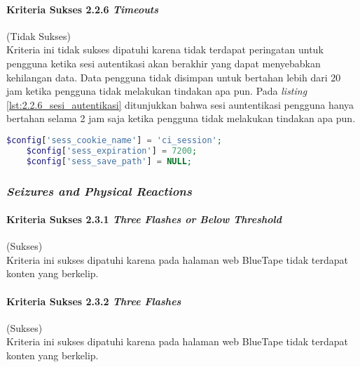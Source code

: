 \paragraph{Kriteria Sukses 2.2.6 \textit{Timeouts}}
\label{par:kepatuhan_bluetape_kriteria_sukses_2.2.6}
(Tidak Sukses)\\

Kriteria ini tidak sukses dipatuhi karena tidak terdapat peringatan untuk pengguna ketika sesi autentikasi akan berakhir yang dapat menyebabkan kehilangan data. Data pengguna tidak disimpan untuk bertahan lebih dari 20 jam ketika pengguna tidak melakukan tindakan apa pun. Pada \textit{listing} \ref{lst:2.2.6_sesi_autentikasi} ditunjukkan bahwa sesi auntentikasi pengguna hanya bertahan selama 2 jam saja ketika pengguna tidak melakukan tindakan apa pun.

\begin{lstlisting}[frame=single, label={lst:2.2.6_sesi_autentikasi}, language=PHP, caption=Kriteria Sukses 2.2.6 - Sesi Autentikasi]
    $config['sess_cookie_name'] = 'ci_session';
    $config['sess_expiration'] = 7200;
    $config['sess_save_path'] = NULL;
\end{lstlisting}

\subsubsection{\textit{Seizures and Physical Reactions}}
\label{subsubsec:kepatuhan_bluetape_seizures_and_physical_reactions}

\paragraph{Kriteria Sukses 2.3.1 \textit{Three Flashes or Below Threshold}}
\label{par:kepatuhan_bluetape_kriteria_sukses_2.3.1}
(Sukses)\\

Kriteria ini sukses dipatuhi karena pada halaman web BlueTape tidak terdapat konten yang berkelip.

\paragraph{Kriteria Sukses 2.3.2 \textit{Three Flashes}}
\label{par:kepatuhan_bluetape_kriteria_sukses_2.3.2}
(Sukses)\\

Kriteria ini sukses dipatuhi karena pada halaman web BlueTape tidak terdapat konten yang berkelip.

